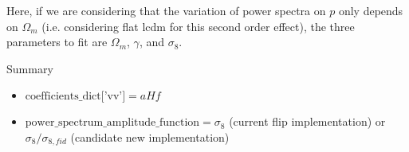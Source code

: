 \documentclass{article}
\begin{document}
Here, if we are considering that the variation of power spectra on $p$ only depends on $\Omega_{m}$ (i.e. considering flat lcdm for this second order effect), the three parameters to fit are $\Omega_{m}$, $\gamma$, and $\sigma_8$.



Summary
\begin{itemize}
    \item $\text{coefficients\_dict['vv']} = aHf$
    \item $\text{power\_spectrum\_amplitude\_function} = \sigma_8$ (current flip implementation) or $\sigma_8/\sigma_{8, fid}$ (candidate new implementation)
\end{itemize}
\end{document}
